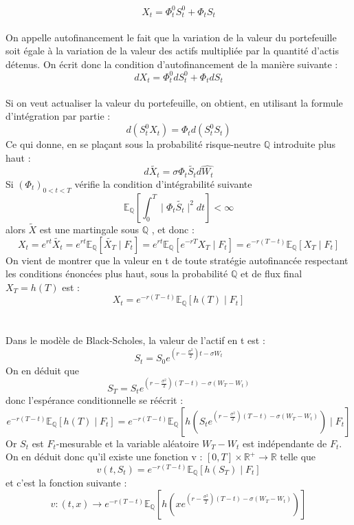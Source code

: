 \documentclass[french,12pt,a4paper]{article}
\begin{document}
$$ X_t = \Phi_{t}^0 S_{t}^0  + \Phi_t S_{t}  $$ \\
On appelle autofinancement le fait que la variation de la valeur du portefeuille soit égale à la variation de la valeur des actifs multipliée par la quantité d'actis détenus. On écrit donc la condition d'autofinancement de la manière suivante :
$$ dX_t = \Phi_{t}^0 dS_{t}^0  + \Phi_t dS_{t}  $$ \\
Si on veut actualiser la valeur du portefeuille, on obtient, en utilisant la formule d'intégration par partie :
$$ d(S_{t}^0 X_t)  = \Phi_{t} d(S_{t}^0 S_{t}) $$
Ce qui donne, en se plaçant sous la probabilité risque-neutre $ \mathbb{Q} $ introduite plus haut :
$$ d \widetilde{X_{t}} = \sigma \Phi_t \widetilde{S_t} d \widehat{W_t}  $$
Si $ ( \Phi_t )_{0<t<T} $ vérifie la condition d'intégrabilité suivante
$$ \mathbb{E}_{\mathbb{Q}} \left [ \int_{0}^T \mid \Phi_t \widetilde{S_t} \mid^2 dt \right ] < \infty  $$
alors $ \widetilde{X} $ est une martingale sous $ \mathbb{Q} $ , et donc :
$$ X_t = e^{rt} \widetilde{X_t} = e^{rt} \mathbb{E}_{\mathbb{Q}} \left [ \widetilde{X_T} \mid F_t \right ] = e^{rt} \mathbb{E}_{\mathbb{Q}} \left [ e^{-rT} X_T \mid F_t \right ] = e^{-r(T-t)} \mathbb{E}_{\mathbb{Q}} \left [ X_T \mid F_t \right ]	$$
On vient de montrer que la valeur en t de toute stratégie autofinancée respectant les conditions énoncées plus haut, sous la probabilité $ \mathbb{Q} $ et de flux final $ X_T = h(T) $ est :
$$ X_t = e^{-r(T-t)} \mathbb{E}_{\mathbb{Q}} \left [ h(T) \mid F_t \right ]  	$$ \\ \\
Dans le modèle de Black-Scholes, la valeur de l'actif en t est :
$$ S_t = S_0 e^{  ( r - \frac{\sigma^2}{2} ) t - \sigma W_t}  	$$
On en déduit que
$$ S_T = S_t e^{ ( r - \frac{\sigma^2}{2} ) (T-t) - \sigma (W_T - W_t) } 	$$
donc l'espérance conditionnelle se réécrit :
$$ e^{-r(T-t)} \mathbb{E}_{\mathbb{Q}} \left [ h(T) \mid F_t \right ] = e^{-r(T-t)} \mathbb{E}_{\mathbb{Q}} \left [ h(S_t e^{ ( r - \frac{\sigma^2}{2} ) (T-t) - \sigma (W_T - W_t) }) \mid F_t \right ] $$
Or $ S_t $ est $ F_t $-mesurable et la variable aléatoire $ W_T - W_t $ est indépendante de $ F_t $.
\\
On en déduit donc qu'il existe une fonction v : $ [0,T]  \times \mathbb{R}^+ \to \mathbb{R} $ telle que
$$ v(t,S_t) = e^{-r(T-t)} \mathbb{E}_{\mathbb{Q}} \left [ h(S_T) \mid F_t \right ] 	$$
et c'est la fonction suivante :
$$ v : (t,x) \to  e^{-r(T-t)} \mathbb{E}_{\mathbb{Q}} \left [ h \left ( x e^{ ( r - \frac{\sigma^2}{2} ) (T-t) - \sigma (W_T - W_t) } \right ) \right ]   	$$
\end{document}
